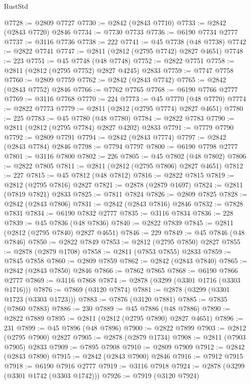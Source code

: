 \begin{lexlean}{RustStd}
\begin{coremodule}
@7728 := @2809 @7727
@7730 := @2842 (@2843 @7710)
@7733 := @2842 (@2843 @7720) @2846
@7734 := @7730 @7733
@7736 := @6190 @7734 @2777
@7737 := @3116 @7736
@7738 := 222
@7741 := @45 @7738 (@48 @7738)
@7742 := @2822 @7741
@7747 := @2811 (@2812 (@2795 @7742) @2827 @4651)
@7748 := 223
@7751 := @45 @7748 (@48 @7748)
@7752 := @2822 @7751
@7758 := @2811 (@2812 (@2795 @7752) @2827 @4245) @2833
@7759 := @7747 @7758
@7760 := @2809 @7759
@7762 := @2842 (@2843 @7742)
@7765 := @2842 (@2843 @7752) @2846
@7766 := @7762 @7765
@7768 := @6190 @7766 @2777
@7769 := @3116 @7768
@7770 := 224
@7773 := @45 @7770 (@48 @7770)
@7774 := @2822 @7773
@7779 := @2811 (@2812 (@2795 @7774) @2827 @4651)
@7780 := 225
@7783 := @45 @7780 (@48 @7780)
@7784 := @2822 @7783
@7790 := @2811 (@2812 (@2795 @7784) @2827 @4202) @2833
@7791 := @7779 @7790
@7792 := @2809 @7791
@7794 := @2842 (@2843 @7774)
@7797 := @2842 (@2843 @7784) @2846
@7798 := @7794 @7797
@7800 := @6190 @7798 @2777
@7801 := @3116 @7800
@7802 := 226
@7805 := @45 @7802 (@48 @7802)
@7806 := @2822 @7805
@7811 := @2811 (@2812 (@2795 @7806) @2827 @4651)
@7812 := 227
@7815 := @45 @7812 (@48 @7812)
@7816 := @2822 @7815
@7819 := @2812 (@2795 @7816) @2827
@7821 := @2878 (@2879 @1697)
@7824 := @2811 (@7819 @7821) @2833
@7825 := @7811 @7824
@7826 := @2809 @7825
@7828 := @2842 (@2843 @7806)
@7831 := @2842 (@2843 @7816) @2846
@7832 := @7828 @7831
@7834 := @6190 @7832 @2777
@7835 := @3116 @7834
@7836 := 228
@7839 := @45 @7836 (@48 @7836)
@7840 := @2822 @7839
@7845 := @2811 (@2812 (@2795 @7840) @2827 @4651)
@7846 := 229
@7849 := @45 @7846 (@48 @7846)
@7850 := @2822 @7849
@7853 := @2812 (@2795 @7850) @2827
@7855 := @2878 (@2879 @1708)
@7858 := @2811 (@7853 @7855) @2833
@7859 := @7845 @7858
@7860 := @2809 @7859
@7862 := @2842 (@2843 @7840)
@7865 := @2842 (@2843 @7850) @2846
@7866 := @7862 @7865
@7868 := @6190 @7866 @2777
@7869 := @3116 @7868
@7874 := @2878 (@3299 (@3301 @1716 (@3303 @1716)))
@7876 := @7869 (@3120 @7874)
@7881 := @2878 (@3299 (@3301 @1723 (@3303 @1723)))
@7883 := @7876 (@3120 @7881)
@7885 := @7835 (@7860 @7883)
@7886 := 230
@7889 := @45 @7886 (@48 @7886)
@7890 := @2822 @7889
@7895 := @2811 (@2812 (@2795 @7890) @2827 @4651)
@7896 := 231
@7899 := @45 @7896 (@48 @7896)
@7900 := @2822 @7899
@7903 := @2812 (@2795 @7900) @2827
@7905 := @2878 (@2879 @1734)
@7908 := @2811 (@7903 @7905) @2833
@7909 := @7895 @7908
@7910 := @2809 @7909
@7912 := @2842 (@2843 @7890)
@7915 := @2842 (@2843 @7900) @2846
@7916 := @7912 @7915
@7918 := @6190 @7916 @2777
@7919 := @3116 @7918
@7924 := @2878 (@3299 (@3301 @1742 (@3303 @1742)))
@7926 := @7919 (@3120 @7924)

\end{coremodule}
\end{lexlean}
